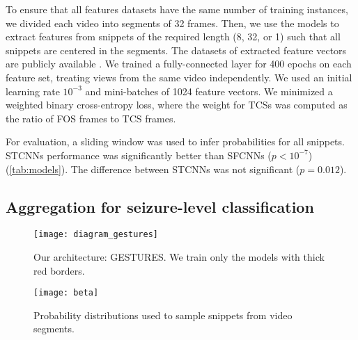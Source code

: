 To ensure that all features datasets have the same number of training instances, we divided each video into segments of 32 frames.
Then, we use the models to extract features from snippets of the required length (8, 32, or 1) such that all snippets are centered in the segments.
The datasets of extracted feature vectors are publicly available \cite{perez-garcia_data_2021}.
We trained a fully-connected layer for 400 epochs on each feature set, treating views from the same video independently.
We used an initial learning rate $10 ^ {-3}$ and mini-batches of 1024 feature vectors.
We minimized a weighted binary cross-entropy loss, where the weight for \acp{TCS} was computed as the ratio of \ac{FOS} frames to \ac{TCS} frames.

For evaluation, a sliding window was used to infer probabilities for all snippets.
\acp{STCNN} performance was significantly better than \acp{SFCNN} ($p < 10 ^ {-7}$) (\cref{tab:models}).
The difference between \acp{STCNN} was not significant ($p = 0.012$).


\subsection{Aggregation for seizure-level classification}
\label{sec:exp_agg}

\begin{figure}
  \centering
  \texttt{[image: diagram\_gestures]}
  \caption[Overview of the GESTURES architecture]{
    Our architecture: \acf{GESTURES}.
    We train only the models with thick red borders.
  }
  \label{fig:gestures}
\end{figure}



\begin{figure}
  \centering
  \texttt{[image: beta]}
  \caption[Probability distributions to sample snippets from video segments]{
    Probability distributions used to sample snippets from video segments.
  }
  \label{fig:betas}
\end{figure}



